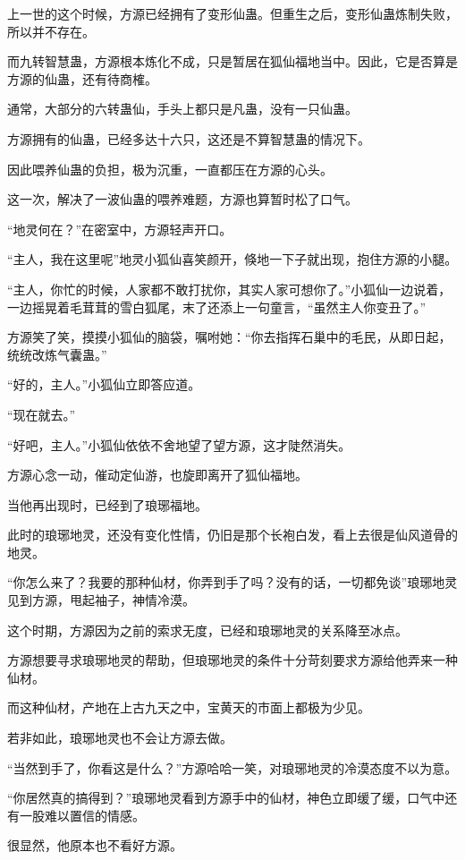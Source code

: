 \begin{this_body}
上一世的这个时候，方源已经拥有了变形仙蛊。但重生之后，变形仙蛊炼制失败，所以并不存在。

而九转智慧蛊，方源根本炼化不成，只是暂居在狐仙福地当中。因此，它是否算是方源的仙蛊，还有待商榷。

通常，大部分的六转蛊仙，手头上都只是凡蛊，没有一只仙蛊。

方源拥有的仙蛊，已经多达十六只，这还是不算智慧蛊的情况下。

因此喂养仙蛊的负担，极为沉重，一直都压在方源的心头。

这一次，解决了一波仙蛊的喂养难题，方源也算暂时松了口气。

“地灵何在？”在密室中，方源轻声开口。

“主人，我在这里呢”地灵小狐仙喜笑颜开，倏地一下子就出现，抱住方源的小腿。

“主人，你忙的时候，人家都不敢打扰你，其实人家可想你了。”小狐仙一边说着，一边摇晃着毛茸茸的雪白狐尾，末了还添上一句童言，“虽然主人你变丑了。”

方源笑了笑，摸摸小狐仙的脑袋，嘱咐她：“你去指挥石巢中的毛民，从即日起，统统改炼气囊蛊。”

“好的，主人。”小狐仙立即答应道。

“现在就去。”

“好吧，主人。”小狐仙依依不舍地望了望方源，这才陡然消失。

方源心念一动，催动定仙游，也旋即离开了狐仙福地。

当他再出现时，已经到了琅琊福地。

此时的琅琊地灵，还没有变化性情，仍旧是那个长袍白发，看上去很是仙风道骨的地灵。

“你怎么来了？我要的那种仙材，你弄到手了吗？没有的话，一切都免谈”琅琊地灵见到方源，甩起袖子，神情冷漠。

这个时期，方源因为之前的索求无度，已经和琅琊地灵的关系降至冰点。

方源想要寻求琅琊地灵的帮助，但琅琊地灵的条件十分苛刻要求方源给他弄来一种仙材。

而这种仙材，产地在上古九天之中，宝黄天的市面上都极为少见。

若非如此，琅琊地灵也不会让方源去做。

“当然到手了，你看这是什么？”方源哈哈一笑，对琅琊地灵的冷漠态度不以为意。

“你居然真的搞得到？”琅琊地灵看到方源手中的仙材，神色立即缓了缓，口气中还有一股难以置信的情感。

很显然，他原本也不看好方源。


\end{this_body}
